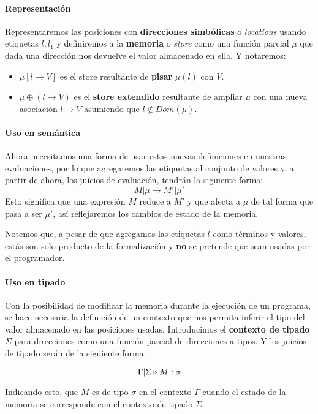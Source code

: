 \paragraph{Representación}
Representaremos las posiciones con \textbf{direcciones simbólicas} o \textit{locations} usando etiquetas $l,l_1$ y definiremos a la \textbf{memoria} o \textit{store} como una función parcial $\mu$ que dada una dirección nos devuelve el valor almacenado en ella. Y notaremos:
\begin{itemize}
	\item $\mu[l\to V]$ es el store resultante de \textbf{pisar} $\mu(l)$ con $V$.
	\item $\mu\oplus(l\to V)$ es el \textbf{store extendido} resultante de ampliar $\mu$ con una nueva asociación $l \to V$ asumiendo que $l \notin Dom(\mu)$.    
\end{itemize}

\paragraph{Uso en semántica} Ahora necesitamos una forma de usar estas nuevas definiciones en nuestras evaluaciones, por lo que agregaremos las etiquetas al conjunto de valores y, a partir de ahora, los juicios de evaluación, tendrán la siguiente forma: 
$$M|\mu \to M'|\mu'$$
Esto significa que una expresión $M$ reduce a $M'$ y que afecta a $\mu$ de tal forma que pasa a ser $\mu'$, así reflejaremos los cambios de estado de la memoria.

Notemos que, a pesar de que agregamos las etiquetas $l$ como términos y valores, estás son solo producto de la formalización y \textbf{no} se pretende que sean usadas por el programador.

\paragraph{Uso en tipado} Con la posibilidad de modificar la memoria durante la ejecución de un programa, se hace necesaria la definición de un contexto que nos permita inferir el tipo del valor almacenado en las posiciones usadas. Introducimos el \textbf{contexto de tipado} $\Sigma$ para direcciones como una función parcial de direcciones a tipos. Y los juicios de tipado serán de la siguiente forma:

$$\Gamma|\Sigma\triangleright M : \sigma$$

Indicando esto, que $M$ es de tipo $\sigma$ en el contexto $\Gamma$ cuando el estado de la memoria se corresponde con el contexto de tipado $\Sigma$.

